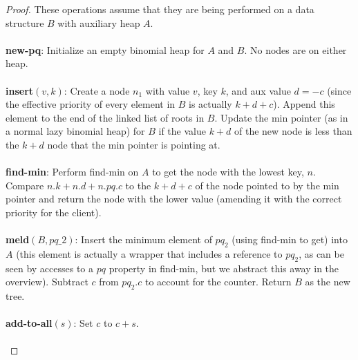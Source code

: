 \documentclass{article}
\theoremstyle{casestyle}
\begin{document}
\begin{proof}
  These operations assume that they are being performed on a data structure $B$ with auxiliary heap $A$.\\\\
  \textbf{new-pq}: Initialize an empty binomial heap for $A$ and $B$. No nodes are on either heap. \\\\
  \textbf{insert}$(v,k)$: Create a node $n_1$ with value $v$, key $k$, and aux value $d=-c$ (since the effective priority of every element in $B$ is actually $k+d+c$). Append this element to the end of the linked list of roots in $B$. Update the min pointer (as in a normal lazy binomial heap) for $B$ if the value $k+d$ of the new node is less than the $k+d$ node that the min pointer is pointing at.\\\\
  \textbf{find-min}: Perform find-min on $A$ to get the node with the lowest key, $n$. Compare $n.k+n.d+n.pq.c$ to the $k+d+c$ of the node pointed to by the min pointer and return the node with the lower value (amending it with the correct priority for the client).\\\\
  \textbf{meld}$(B,pq\_2)$: Insert the minimum element of $pq_2$ (using find-min to get) into $A$ (this element is actually a wrapper that includes a reference to $pq_2$, as can be seen by accesses to a $pq$ property in find-min, but we abstract this away in the overview). Subtract $c$ from $pq_2.c$ to account for the counter. Return $B$ as the new tree.\\\\
  \textbf{add-to-all}$(s)$: Set $c$ to $c + s$.  \\\\

\end{proof}
\end{document}
